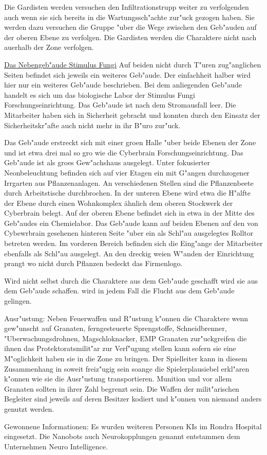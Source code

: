 Die Gardisten werden versuchen den Infiltrationstrupp weiter zu verfolgenden auch wenn sie sich bereits in die Wartungssch"achte zur"uck gezogen haben. Sie werden dazu versuchen die Gruppe "uber die Wege zwischen den Geb"auden auf der oberen Ebene zu verfolgen. Die Gardisten werden die Charaktere nicht nach au\3erhalb der Zone verfolgen.

\underline{Das Nebengeb"aude Stimulus Fungi} Auf beiden nicht durch T"uren zug"anglichen Seiten befindet sich jeweils ein weiteres Geb"aude. Der einfachheit halber wird hier nur ein weiteres Geb"aude beschrieben. Bei dem anliegenden Geb"aude handelt es sich um das biologische Labor der Stimulus Fungi Forschungseinrichtung. Das Geb"aude ist nach dem Stromausfall leer. Die Mitarbeiter haben sich in Sicherheit gebracht und konnten durch den Einsatz der Sicherheitskr"afte auch nicht mehr in ihr B"uro zur"uck. 

Das Geb"aude erstreckt sich mit einer gro\3en Halle "uber beide Ebenen der Zone und ist etwa drei mal so gro\3 wie die Cyberbrain Forschungseinrichtung. Das Geb"aude ist als gro\3es Gew"achshaus ausgelegt. Unter fokusierter Neonbeleuchtung befinden sich auf vier Etagen ein mit G"angen durchzogener Irrgarten aus Pflanzenanlagen. An verschiedenen Stellen sind die Pflanzenbeete durch Arbeitstische durchbrochen. In der unteren Ebene wird etwa die H"alfte der Ebene durch einen Wohnkomplex ähnlich dem oberen Stockwerk der Cyberbrain belegt. Auf der oberen Ebene befindet sich in etwa in der Mitte des Geb"audes ein Chemielabor. Das Geb"aude kann auf beiden Ebenen auf den von Cybewrbrain gesehenen hinteren Seite "uber ein als Schl"au\3 ausgelegtes Rolltor betreten werden. Im vorderen Bereich befinden sich die Eing"ange der Mitarbeiter ebenfalls als Schl"au\3 ausgelegt. An den dreckig wei\3en W"anden der Einrichtung prangt wo nicht durch Pflanzen bedeckt das Firmenlogo.

\underline{\ml{}} Wird \ml{} nicht selbst durch die Charaktere aus dem Geb"aude geschafft wird \xl{} sie aus dem Geb"aude schaffen. \ml{} wird in jedem Fall die Flucht aus dem Geb"aude gelingen.

\begin{remarks}
	Ausr"ustung: Neben Feuerwaffen und R"ustung k"onnen die Charaktere wenn gew"unscht auf Granaten, ferngesteuerte Sprengstoffe, Schneidbrenner, "Uberwachungsdrohnen, Magschlo\3knacker, EMP Granaten zur"uckgreifen die ihnen das Protektoratsmilit"ar zur Verf"ugung stellen kann sofern sie eine M"oglichkeit haben sie in die Zone zu bringen. Der Spielleiter kann in diesem Zusammenhang in soweit freiz"ugig sein soange die Spielerplausiebel erkl"aren k"onnen wie sie die Ausr"ustung transportieren. Munition und vor allem Granaten sollten in ihrer Zahl begrenzt sein. Die Waffen der milit"arischen Begleiter sind jeweils auf deren Besitzer kodiert und k"onnen von
	niemand anders genutzt werden.



	Gewonnene Informationen:  Es wurden weiteren Personen KIs im Rondra Hospital eingesetzt. Die Nanobots auch Neurokopplungen genannt entstammen dem Unternehmen Neuro Intelligence. 
\end{remarks}


